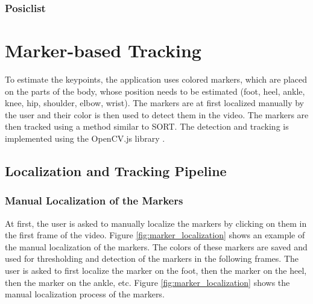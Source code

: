 \subsection{Posiclist}

\chapter{Marker-based Tracking}
\label{marker_based_tracking}
To estimate the keypoints, the application uses colored markers, which are placed on the parts of the body, whose position needs to be estimated (foot, heel, ankle, knee, hip, shoulder, elbow, wrist). The markers are at first localized manually by the user and their color is then used to detect them in the video. The markers are then tracked using a method similar to SORT. The detection and tracking is implemented using the OpenCV.js library \cite{opencvjs}.

\section{Localization and Tracking Pipeline}

\subsection{Manual Localization of the Markers}
\label{manual_localization_of_the_markers}
At first, the user is asked to manually localize the markers by clicking on them in the first frame of the video. Figure \ref{fig:marker_localization} shows an example of the manual localization of the markers. The colors of these markers are saved and used for thresholding and detection of the markers in the following frames. The user is asked to first localize the marker on the foot, then the marker on the heel, then the marker on the ankle, etc. Figure \ref{fig:marker_localization} shows the manual localization process of the markers.


